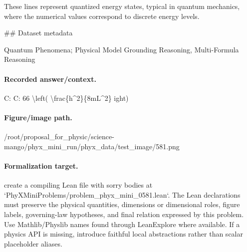 These lines represent quantized energy states, typical in quantum mechanics, where the numerical values correspond to discrete energy levels.

\#\# Dataset metadata

Quantum Phenomena; Physical Model Grounding Reasoning, Multi-Formula Reasoning

\paragraph{Recorded answer/context.}
C: C: 66 \textbackslash{}left( \textbackslash{}frac\{h\textasciicircum{}2\}\{8mL\textasciicircum{}2\} 
ight)

\paragraph{Figure/image path.}
/root/proposal\_for\_physic/science-mango/phyx\_mini\_run/phyx\_data/test\_image/581.png

\paragraph{Formalization target.}
create a compiling Lean file with sorry bodies at `PhyXMiniProblems/problem\_phyx\_mini\_0581.lean`. The Lean declarations must preserve the physical quantities, dimensions or dimensional roles, figure labels, governing-law hypotheses, and final relation expressed by this problem.
Use Mathlib/Physlib names found through LeanExplore where available. If a physics API is missing, introduce faithful local abstractions rather than scalar placeholder aliases.

